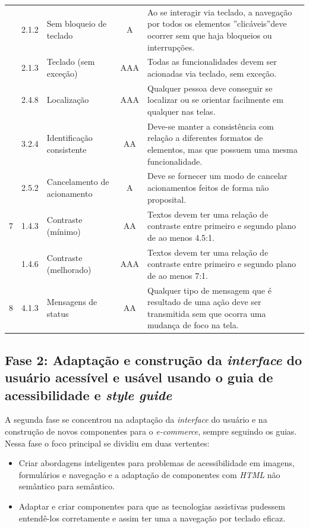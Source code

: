 {{\begin{minipage}{\linewidth}
{\begin{tabular}{|c|l|l|c|p{400px}|}
        \cline{2-5} & 2.1.2 & Sem bloqueio de teclado & A & Ao se interagir via teclado, a navegação por todos os elementos ”clicáveis”deve ocorrer sem que haja bloqueios ou interrupções.\\
        \cline{2-5} & 2.1.3 & Teclado (sem exceção) & AAA & Todas as funcionalidades devem ser acionadas via teclado, sem exceção.\\
        \cline{2-5} & 2.4.8 & Localização & AAA & Qualquer pessoa deve conseguir se localizar ou se orientar facilmente em qualquer nas telas.\\
        \cline{2-5} & 3.2.4 & Identificação consistente & AA & Deve-se manter a consistência com relação a diferentes formatos de elementos, mas que possuem uma mesma funcionalidade.\\
        \cline{2-5} & 2.5.2 & Cancelamento de acionamento & A & Deve se fornecer um modo de cancelar acionamentos feitos de forma não proposital.\\
    \hline
    7 & 1.4.3 & 
        Contraste (mínimo) & AA & Textos devem ter uma relação de contraste entre primeiro e segundo plano de ao menos 4.5:1.\\
        \cline{2-5} & 1.4.6 & Contraste (melhorado) & AAA & Textos devem ter uma relação de contraste entre primeiro e segundo plano de ao menos 7:1.\\
    \hline
    8 & 4.1.3 & 
        Mensagens de status & AA & Qualquer tipo de mensagem que é resultado de uma ação deve ser transmitida sem que ocorra uma mudança de foco na tela.\\
    \hline

\end{tabular}
}
\label{elementos de UI}

\end{minipage}

}}


\subsection{Fase 2: Adaptação e construção da \textit{interface} do usuário acessível e usável usando o guia de acessibilidade e \textit{style guide}}
{A segunda fase se concentrou na adaptação da \textit{interface} do usuário e na construção de novos componentes para o \textit{e-commerce}, sempre seguindo os guias. Nessa fase o foco principal se dividiu em duas vertentes:
\begin{itemize}
\item Criar abordagens inteligentes para problemas de acessibilidade em imagens, formulários e navegação e a adaptação de componentes com \textit{HTML} \cite{HTML} não semântico para semântico.
\item  Adaptar e criar componentes para que as tecnologias assistivas pudessem entendê-los corretamente e assim ter uma a navegação por teclado eficaz.

\end{itemize}
}
